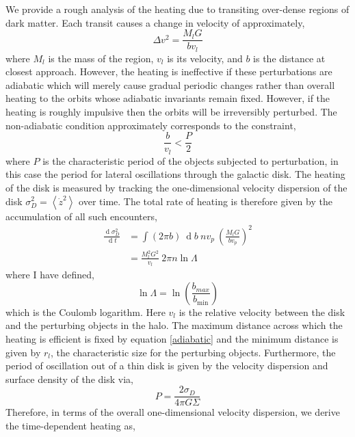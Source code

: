 \documentclass[usenatbib]{mnras}
\renewcommand{\d}[1]{\! \mathrm{d}#1 \:}
\newcommand{\deriv}[2]{\frac{\d{#1}}{\d{#2}}}
\renewcommand{\d}[1]{\ensuremath{\operatorname{d}\!{#1}}}
\begin{document}
We provide a rough analysis of the heating due to transiting over-dense regions of dark matter. Each transit causes a change in velocity of approximately,
\begin{equation}
\Delta v^2 = \frac{M_l G}{b v_l}
\end{equation}
where $M_l$ is the mass of the region, $v_l$ is its velocity, and $b$ is the distance at closest approach. However, the heating is ineffective if these perturbations are adiabatic which will merely cause gradual periodic changes rather than overall heating to the orbits whose adiabatic invariants remain fixed. However, if the heating is roughly impulsive then the orbits will be irreversibly perturbed. The non-adiabatic condition approximately corresponds to the constraint,
\begin{equation} \label{adiabatic}
\frac{b}{v_l} < \frac{P}{2}
\end{equation}
where $P$ is the characteristic period of the objects subjected to perturbation, in this case the period for lateral oscillations through the galactic disk. The heating of the disk is measured by tracking the one-dimensional velocity dispersion of the disk $\sigma_D^2 = \left< \dot{z}^2 \right>$ over time. The total rate of heating is therefore given by the accumulation of all such encounters,
\begin{subequations}
\begin{align}
\deriv{\sigma_D^2}{t} &= \int (2 \pi b) \: \d{b} \: n v_p \: \left( \frac{M_l G}{b v_p} \right)^2 
\\
& = \frac{M_l^2 G^2}{v_l} \: 2 \pi n \ln{\Lambda}
\end{align}
\end{subequations}
where I have defined,
\begin{equation}
\ln{\Lambda} = \ln{\left( \frac{b_{max}}{b_{\text{min}}} \right)}
\end{equation}
which is the Coulomb logarithm. Here $v_l$ is the relative velocity between the disk and the perturbing objects in the halo. 
The maximum distance across which the heating is efficient is fixed by equation \ref{adiabatic} and the minimum distance is given by $r_l$, the characteristic size for the perturbing objects. Furthermore, the period of oscillation out of a thin disk is given by the velocity dispersion and surface density of the disk via,
\begin{equation}
P = \frac{2 \sigma_D}{4 \pi G \Sigma}
\end{equation} 
Therefore, in terms of the overall one-dimensional velocity dispersion, we derive the time-dependent heating as,
\end{document}
